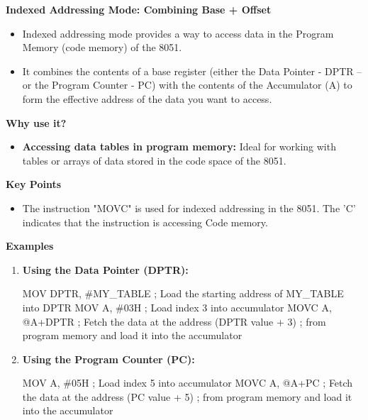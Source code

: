 \documentclass[
]{article}
\newenvironment{Shaded}{}{}
\newcommand{\NormalTok}[1]{#1}
\begin{document}
\textbf{Indexed Addressing Mode: Combining Base + Offset}

\begin{itemize}
\item
  Indexed addressing mode provides a way to access data in the Program
  Memory (code memory) of the 8051.
\item
  It combines the contents of a base register (either the Data Pointer -
  DPTR -- or the Program Counter - PC) with the contents of the
  Accumulator (A) to form the effective address of the data you want to
  access.
\end{itemize}

\textbf{Why use it?}

\begin{itemize}
\item
  \textbf{Accessing data tables in program memory:} Ideal for working
  with tables or arrays of data stored in the code space of the 8051.
\end{itemize}

\textbf{Key Points}

\begin{itemize}
\item
  The instruction "MOVC" is used for indexed addressing in the 8051. The
  'C' indicates that the instruction is accessing Code memory.
\end{itemize}

\textbf{Examples}

\begin{enumerate}
\def\labelenumi{\arabic{enumi}.}
\item
  \textbf{Using the Data Pointer (DPTR):}

\begin{Shaded}
\begin{Highlighting}[]
\NormalTok{MOV DPTR, \#MY\_TABLE   ; Load the starting address of \textquotesingle{}MY\_TABLE\textquotesingle{} into DPTR}
\NormalTok{MOV A, \#03H           ; Load index \textquotesingle{}3\textquotesingle{} into accumulator}
\NormalTok{MOVC A, @A+DPTR       ; Fetch the data at the address (DPTR value + 3)}
\NormalTok{                          ; from program memory and load it into the accumulator}
\end{Highlighting}
\end{Shaded}
\item
  \textbf{Using the Program Counter (PC):}

\begin{Shaded}
\begin{Highlighting}[]
\NormalTok{MOV A, \#05H           ; Load index \textquotesingle{}5\textquotesingle{} into accumulator}
\NormalTok{MOVC A, @A+PC         ; Fetch the data at the address (PC value + 5)}
\NormalTok{                          ; from program memory and load it into the accumulator}
\end{Highlighting}
\end{Shaded}
\end{enumerate}
\end{document}
